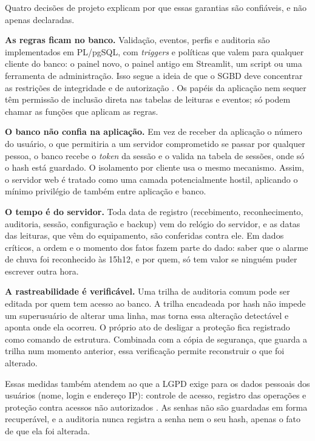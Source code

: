 Quatro decisões de projeto explicam por que essas garantias são confiáveis, e não apenas declaradas.

\textbf{As regras ficam no banco.} Validação, eventos, perfis e auditoria são implementados em PL/pgSQL, com \textit{triggers} e políticas que valem para qualquer cliente do banco: o painel novo, o painel antigo em Streamlit, um script ou uma ferramenta de administração. Isso segue a ideia de que o SGBD deve concentrar as restrições de integridade e de autorização \parencite{elmasri2018}. Os papéis da aplicação nem sequer têm permissão de inclusão direta nas tabelas de leituras e eventos; só podem chamar as funções que aplicam as regras.

\textbf{O banco não confia na aplicação.} Em vez de receber da aplicação o número do usuário, o que permitiria a um servidor comprometido se passar por qualquer pessoa, o banco recebe o \textit{token} da sessão e o valida na tabela de sessões, onde só o hash está guardado. O isolamento por cliente usa o mesmo mecanismo. Assim, o servidor web é tratado como uma camada potencialmente hostil, aplicando o mínimo privilégio de \textcite{saltzer1975} também entre aplicação e banco.

\textbf{O tempo é do servidor.} Toda data de registro (recebimento, reconhecimento, auditoria, sessão, configuração e backup) vem do relógio do servidor, e as datas das leituras, que vêm do equipamento, são conferidas contra ele. Em dados críticos, a ordem e o momento dos fatos fazem parte do dado: saber que o alarme de chuva foi reconhecido às 15h12, e por quem, só tem valor se ninguém puder escrever outra hora.

\textbf{A rastreabilidade é verificável.} Uma trilha de auditoria comum pode ser editada por quem tem acesso ao banco. A trilha encadeada por hash \parencite{schneier1999,haber1991} não impede um superusuário de alterar uma linha, mas torna essa alteração detectável e aponta onde ela ocorreu. O próprio ato de desligar a proteção fica registrado como comando de estrutura. Combinada com a cópia de segurança, que guarda a trilha num momento anterior, essa verificação permite reconstruir o que foi alterado.

Essas medidas também atendem ao que a LGPD exige para os dados pessoais dos usuários (nome, login e endereço IP): controle de acesso, registro das operações e proteção contra acessos não autorizados \parencite{lgpd2018}. As senhas não são guardadas em forma recuperável, e a auditoria nunca registra a senha nem o seu hash, apenas o fato de que ela foi alterada.
